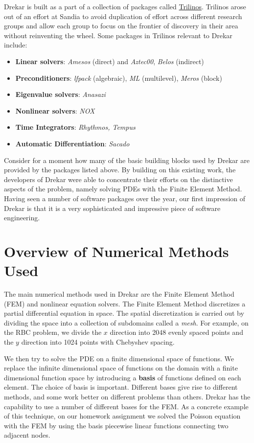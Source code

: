 \documentclass[11pt]{article} %
\begin{document}
Drekar is built as a part of a collection of packages called
\href{https://trilinos.github.io/}{Trilinos}.
Trilinos arose out of an effort at Sandia to avoid duplication of effort across
different research groups and allow each group to focus on the frontier
of discovery in their area without reinventing the wheel.
Some packages in Trilinos relevant to Drekar include:
\begin{itemize}
\item{\textbf{Linear solvers}}: \textit{Amesos} (direct) and \textit{Aztec00}, \textit{Belos} (indirect)
\item{\textbf{Preconditioners}}: \textit{lfpack} (algebraic), \textit{ML} (multilevel), \textit{Meros} (block)
\item{\textbf{Eigenvalue solvers}}: \textit{Anasazi}
\item{\textbf{Nonlinear solvers}}: \textit{NOX}
\item{\textbf{Time Integrators}}: \textit{Rhythmos, Tempus}
\item{\textbf{Automatic Differentiation}}: \textit{Sacado}
\end{itemize}
Consider for a moment how many of the basic building blocks used by Drekar
are provided by the packages listed above.
By building on this existing work, the developers of Drekar were able 
to concentrate their efforts on the distinctive aspects of the problem,
namely solving PDEs with the Finite Element Method.
Having seen a number of software packages over the year, 
our first impression of Drekar is that it is a very sophisticated 
and impressive piece of software engineering.

\section{Overview of Numerical Methods Used}
The main numerical methods used in Drekar are the Finite Element Method (FEM)
and nonlinear equation solvers.
The Finite Element Method discretizes a partial differential equation in space.
The spatial discretization is carried out by dividing the space into a collection of
subdomains called a \textit{mesh}.  
For example, on the RBC problem, we divide the $x$ direction into 2048 evenly spaced
points and the $y$ direction into 1024 points with Chebyshev spacing.

We then try to solve the PDE on a finite dimensional space of functions.
We replace the infinite dimensional space of functions on the domain with a finite
dimensional function space by introducing a \textbf{basis} of functions defined on each element.
The choice of basis is important.  
Different bases give rise to different methods, and some work better on different problems than others.
Drekar has the capability to use a number of different bases for the FEM.
As a concrete example of this technique, on our homework assignment we solved the Poisson
equation with the FEM by using the basis piecewise linear functions 
connecting two adjacent nodes.
\end{document}
